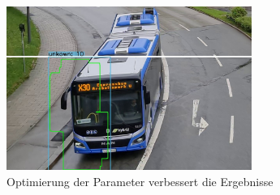 \documentclass[conference]{IEEEtran}
\begin{document}
	\begin{figure}[!h]
		\begin{center}
			\includegraphics[width=8cm]{Media/Output_847-MOGV2Cut}
			\caption{Optimierung der Parameter verbessert die Ergebnisse}
			\label{mogFehler6}
		\end{center}
	\end{figure}

	\newpage
\end{document}
